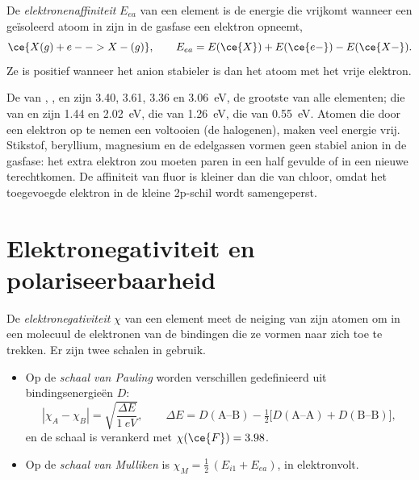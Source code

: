 \begin{definition}[Elektronenaffiniteit]\label{def:b1:periodicity:electron-affinity}
De \emph{elektronenaffiniteit} $E_{ea}$ van
een element is de energie die vrijkomt wanneer een geïsoleerd atoom in
zijn  in de gasfase een elektron opneemt,
\[
  \ce{X(g) + e- -> X-(g)}, \qquad E_{ea} = E(\ce{X}) + E(\ce{e-}) - E(\ce{X-}) .
\]
Ze is positief wanneer het anion stabieler is dan het atoom met het
vrije elektron.
\end{definition}

\begin{example}\label{ex:b1:periodicity:ea}
De  van , ,  en  zijn
3.40, 3.61, 3.36 en \qty{3.06}{eV}, de grootste van alle elementen; die
van  en  zijn 1.44 en \qty{2.02}{eV}, die van 
\qty{1.26}{eV}, die van  \qty{0.55}{eV}. Atomen die door een
elektron op te nemen een  voltooien (de halogenen), maken veel
energie vrij. Stikstof, beryllium, magnesium en de edelgassen vormen geen
stabiel anion in de gasfase: het extra elektron zou moeten paren in een
half gevulde  of in een nieuwe  terechtkomen. De
affiniteit van fluor is kleiner dan die van chloor, omdat het toegevoegde
elektron in de kleine 2p-schil wordt samengeperst.
\end{example}


\section{Elektronegativiteit en polariseerbaarheid}

\begin{definition}[Elektronegativiteit]\label{def:b1:periodicity:electronegativity}
De \emph{elektronegativiteit} $\chi$ van een
element meet de neiging van zijn atomen om in een molecuul de elektronen
van de bindingen die ze vormen naar zich toe te trekken. Er zijn twee
schalen in gebruik.
\begin{itemize}
  \item Op de \emph{schaal van Pauling} worden
        verschillen gedefinieerd uit bindingsenergieën $D$:
        \[
          |\chi_A - \chi_B| = \sqrt{\frac{\Delta E}{\qty{1}{eV}}}, \qquad
          \Delta E = D(\text{A--B}) - \tfrac12\big[D(\text{A--A}) +
          D(\text{B--B})\big],
        \]
        en de schaal is verankerd met $\chi(\ce{F}) = 3.98$.
  \item Op de \emph{schaal van Mulliken} is
        $\chi_M = \tfrac12\,(E_{i1} + E_{ea})$, in elektronvolt.
\end{itemize}
\end{definition}

